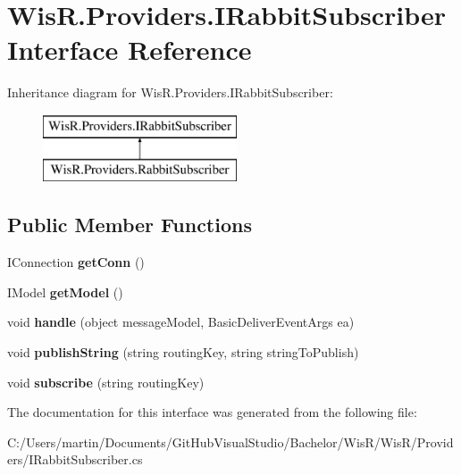 \hypertarget{interface_wis_r_1_1_providers_1_1_i_rabbit_subscriber}{}\section{Wis\+R.\+Providers.\+I\+Rabbit\+Subscriber Interface Reference}
\label{interface_wis_r_1_1_providers_1_1_i_rabbit_subscriber}
Inheritance diagram for Wis\+R.\+Providers.\+I\+Rabbit\+Subscriber\+:\begin{figure}[H]
\begin{center}
\leavevmode
\includegraphics[height=2.000000cm]{interface_wis_r_1_1_providers_1_1_i_rabbit_subscriber}
\end{center}
\end{figure}
\subsection*{Public Member Functions}
\begin{DoxyCompactItemize}
\item 
\hypertarget{interface_wis_r_1_1_providers_1_1_i_rabbit_subscriber_aa46c762a9a1555f6129c15104b5d3ef5}{}I\+Connection {\bfseries get\+Conn} ()\label{interface_wis_r_1_1_providers_1_1_i_rabbit_subscriber_aa46c762a9a1555f6129c15104b5d3ef5}

\item 
\hypertarget{interface_wis_r_1_1_providers_1_1_i_rabbit_subscriber_a4a5c4407a07c7a2709e6e032b32b19dc}{}I\+Model {\bfseries get\+Model} ()\label{interface_wis_r_1_1_providers_1_1_i_rabbit_subscriber_a4a5c4407a07c7a2709e6e032b32b19dc}

\item 
\hypertarget{interface_wis_r_1_1_providers_1_1_i_rabbit_subscriber_a27621fde49f599881dd8ebc9180d821a}{}void {\bfseries handle} (object message\+Model, Basic\+Deliver\+Event\+Args ea)\label{interface_wis_r_1_1_providers_1_1_i_rabbit_subscriber_a27621fde49f599881dd8ebc9180d821a}

\item 
\hypertarget{interface_wis_r_1_1_providers_1_1_i_rabbit_subscriber_a1c43be57473c29ac9f445b46b5d51a4c}{}void {\bfseries publish\+String} (string routing\+Key, string string\+To\+Publish)\label{interface_wis_r_1_1_providers_1_1_i_rabbit_subscriber_a1c43be57473c29ac9f445b46b5d51a4c}

\item 
\hypertarget{interface_wis_r_1_1_providers_1_1_i_rabbit_subscriber_ae1042fd415e8f4b507246f5b9ffd8f6a}{}void {\bfseries subscribe} (string routing\+Key)\label{interface_wis_r_1_1_providers_1_1_i_rabbit_subscriber_ae1042fd415e8f4b507246f5b9ffd8f6a}

\end{DoxyCompactItemize}


The documentation for this interface was generated from the following file\+:\begin{DoxyCompactItemize}
\item 
C\+:/\+Users/martin/\+Documents/\+Git\+Hub\+Visual\+Studio/\+Bachelor/\+Wis\+R/\+Wis\+R/\+Providers/I\+Rabbit\+Subscriber.\+cs\end{DoxyCompactItemize}
